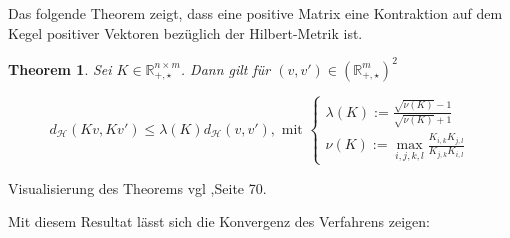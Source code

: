 \documentclass[11pt,a4paper]{article}
\newtheorem{theorem}{Theorem}[subsection]
\numberwithin{equation}{section}
\begin{document}
	
	Das folgende Theorem zeigt, dass eine positive Matrix eine Kontraktion auf dem Kegel positiver Vektoren bezüglich der Hilbert-Metrik ist.
	
	\begin{theorem}\label{theorem41}
		Sei $K \in \mathbb{R}_{+,\star}^{n \times m}$. Dann gilt für $(v,v') \in (\mathbb{R}_{+, \star}^m)^2$
		
		\begin{equation}
		d_\mathcal{H}(Kv,Kv') \leq \lambda (K) d_\mathcal{H}(v,v'), \text{ mit } \begin{cases}
		\lambda (K) := \frac{\sqrt{\nu (K)} -1}{\sqrt{\nu (K)}+1}\\
		\nu (K) := \max_{i,j,k,l} \frac{K_{i,k}K_{j,l}}{K_{j,k}K_{i,l}}
		
		\end{cases}
		\end{equation}
	\end{theorem}
	
	Visualisierung des Theorems vgl \cite{COTcuturi},Seite 70.
	
	Mit diesem Resultat lässt sich die Konvergenz des Verfahrens zeigen:
	
\end{document}
